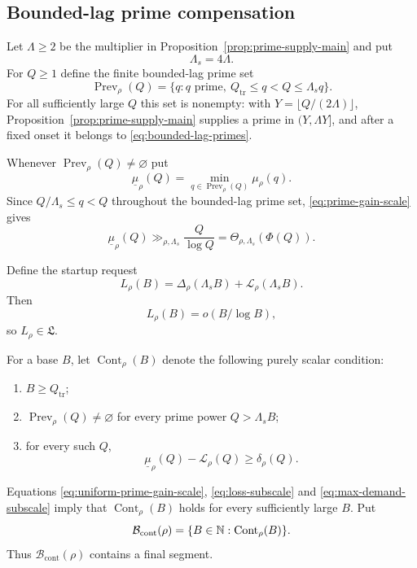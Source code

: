 \subsection{Bounded-lag prime compensation}

Let $\Lambda\ge2$ be the multiplier in Proposition~\ref{prop:prime-supply-main} and put
\begin{equation}\label{eq:prime-lag}
\Lambda_s=4\Lambda.
\end{equation}
For $Q\ge1$ define the finite bounded-lag prime set
\begin{equation}\label{eq:bounded-lag-primes}
\operatorname{Prev}_\rho(Q)=
\{q:q\text{ prime},\ Q_{\mathrm{tr}}\le q<Q\le\Lambda_s q\}.
\end{equation}
For all sufficiently large $Q$ this set is nonempty: with $Y=\lfloor Q/(2\Lambda)\rfloor$, Proposition~\ref{prop:prime-supply-main} supplies a prime in $(Y,\Lambda Y]$, and after a fixed onset it belongs to \eqref{eq:bounded-lag-primes}.

Whenever $\operatorname{Prev}_\rho(Q)\ne\varnothing$ put
\begin{equation}\label{eq:uniform-prime-gain}
\underline\mu_\rho(Q)
=
\min_{q\in\operatorname{Prev}_\rho(Q)}\mu_\rho(q).
\end{equation}
Since $Q/\Lambda_s\le q<Q$ throughout the bounded-lag prime set, \eqref{eq:prime-gain-scale} gives
\begin{equation}\label{eq:uniform-prime-gain-scale}
\underline\mu_\rho(Q)
\gg_{\rho,\Lambda_s}\frac Q{\log Q}
=\Theta_{\rho,\Lambda_s}(\Phi(Q)).
\end{equation}

Define the startup request
\begin{equation}\label{eq:startup-request}
L_\rho(B)=\Delta_\rho(\Lambda_sB)+\mathcal L_\rho(\Lambda_sB).
\end{equation}
Then
\begin{equation}\label{eq:startup-subscale-scalar}
L_\rho(B)=o(B/\log B),
\end{equation}
so $L_\rho\in\mathfrak L$.

For a base $B$, let $\operatorname{Cont}_\rho(B)$ denote the following purely scalar condition:
\begin{enumerate}[label=(\roman*)]
\item $B\ge Q_{\mathrm{tr}}$;
\item $\operatorname{Prev}_\rho(Q)\ne\varnothing$ for every prime power $Q>\Lambda_sB$;
\item for every such $Q$,
\begin{equation}\label{eq:continuation-inequality}
\underline\mu_\rho(Q)-\mathcal L_\rho(Q)\ge\delta_\rho(Q).
\end{equation}
\end{enumerate}
Equations \eqref{eq:uniform-prime-gain-scale}, \eqref{eq:loss-subscale} and \eqref{eq:max-demand-subscale} imply that $\operatorname{Cont}_\rho(B)$ holds for every sufficiently large $B$.
Put
\begin{equation}\label{eq:continuation-base-set}
\mathcal B_{\mathrm{cont}}(\rho)=\{B\in\mathbb N:\operatorname{Cont}_\rho(B)\}.
\end{equation}
Thus $\mathcal B_{\mathrm{cont}}(\rho)$ contains a final segment.


